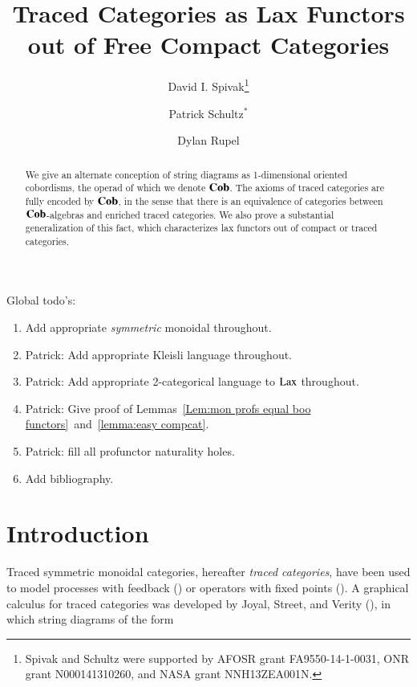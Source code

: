 \documentclass[12pt,oneside,article,draft]{memoir}
\title{Traced Categories as Lax Functors out of Free Compact Categories}
\author{
David I. Spivak\thanks{Spivak and Schultz were supported by AFOSR grant FA9550-14-1-0031, ONR grant N000141310260, and NASA grant NNH13ZEA001N.}
 \and 
 Patrick Schultz${}^*$%
 \and
 Dylan Rupel 
 }
\begin{document}
\tightlists
\firmlists

\maketitle
\begin{abstract}
We give an alternate conception of string diagrams as 1-dimensional oriented cobordisms, the operad of which we denote $\mathbf{Cob}$. The axioms of traced categories are fully encoded by $\mathbf{Cob}$, in the sense that there is an equivalence of categories between $\mathbf{Cob}$-algebras and enriched traced categories. We also prove a substantial generalization of this fact, which characterizes lax functors out of compact or traced categories.
\end{abstract}
Global todo's:
\begin{enumerate}
\item Add appropriate {\em symmetric} monoidal throughout.
\item Patrick: Add appropriate Kleisli language throughout.
\item Patrick: Add appropriate 2-categorical language to $\operatorname{Lax}$ throughout.
\item Patrick: Give proof of Lemmas~\ref{Lem:mon profs equal boo functors}~and~\ref{lemma:easy compcat}.
\item Patrick: fill all profunctor naturality holes.
\item Add bibliography.
\end{enumerate}


\setcounter{tocdepth}{1}
\tableofcontents*


\chapter{Introduction}

Traced symmetric monoidal categories, hereafter \emph{traced categories}, have been used to model processes with feedback (\cite{http://arxiv.org/pdf/1401.5113v1.pdf})  or operators with fixed points (\cite{http://arxiv.org/pdf/1107.6032.pdf}). A graphical calculus for traced categories was developed by Joyal, Street, and Verity (\cite{JoyalStreetVerity}), in which string diagrams of the form
\end{document}
